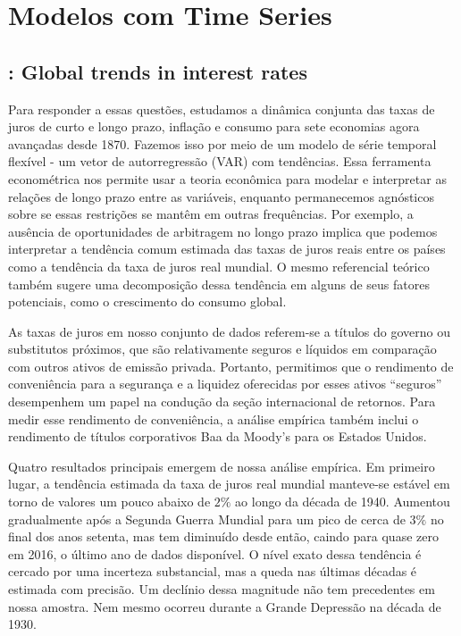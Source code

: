\chapter{Modelos com Time Series}
%
%
\section{\citet{DelNegro:2019}: Global trends in interest rates}

Para responder a essas questões, estudamos a dinâmica conjunta das taxas de juros de curto e longo prazo, inflação e consumo para sete economias agora avançadas desde 1870. Fazemos isso por meio de um modelo de série temporal flexível - um vetor de autorregressão (VAR) com tendências. Essa ferramenta econométrica nos permite usar a teoria econômica para modelar e interpretar as relações de longo prazo entre as variáveis, enquanto permanecemos agnósticos sobre se essas restrições se mantêm em outras frequências. Por exemplo, a ausência de oportunidades de arbitragem no longo prazo implica que podemos interpretar a tendência comum estimada das taxas de juros reais entre os países como a tendência da taxa de juros real mundial. O mesmo referencial teórico também sugere uma decomposição dessa tendência em alguns de seus fatores potenciais, como o crescimento do consumo global.

As taxas de juros em nosso conjunto de dados referem-se a títulos do governo ou substitutos próximos, que são relativamente seguros e líquidos em comparação com outros ativos de emissão privada. Portanto, permitimos que o rendimento de conveniência para a segurança e a liquidez oferecidas por esses ativos “seguros” desempenhem um papel na condução da seção internacional de retornos. Para medir esse rendimento de conveniência, a análise empírica também inclui o rendimento de títulos corporativos Baa da Moody's para os Estados Unidos.

Quatro resultados principais emergem de nossa análise empírica. Em primeiro lugar, a tendência estimada da taxa de juros real mundial manteve-se estável em torno de valores um pouco abaixo de $2\%$ ao longo da década de 1940. Aumentou gradualmente após a Segunda Guerra Mundial para um pico de cerca de $3\%$ no final dos anos setenta, mas tem diminuído desde então, caindo para quase zero em 2016, o último ano de dados disponível. O nível exato dessa tendência é cercado por uma incerteza substancial, mas a queda nas últimas décadas é estimada com precisão. Um declínio dessa magnitude não tem precedentes em nossa amostra. Nem mesmo ocorreu durante a Grande Depressão na década de 1930.

